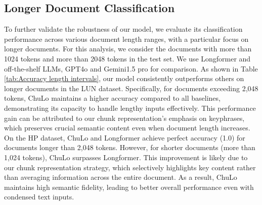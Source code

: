 \documentclass[11pt]{article}
\begin{document}
\subsection{Longer Document Classification}
To further validate the robustness of our model, we evaluate its classification performance across various document length ranges, with a particular focus on longer documents. For this analysis, we consider the documents with more than 1024 tokens and more than 2048 tokens in the test set. 
We use Longformer 
and off-the-shelf LLMs, GPT4o and Gemini1.5 pro for comparison. 
As shown in Table \ref{tab:Accuracy length intervals}, our model consistently outperforms others on longer documents in the LUN dataset. Specifically, for documents exceeding 2,048 tokens, ChuLo maintains a higher accuracy compared to all baselines, demonstrating its capacity to handle lengthy inputs effectively. This performance gain can be attributed to our chunk representation’s emphasis on keyphrases, which preserves crucial semantic content even when document length increases.
On the HP dataset, ChuLo and Longformer achieve perfect accuracy (1.0) for documents longer than 2,048 tokens. However, for shorter documents (more than 1,024 tokens), ChuLo surpasses Longformer. This improvement is likely due to our chunk representation strategy, which selectively highlights key content rather than averaging information across the entire document. As a result, ChuLo maintains high semantic fidelity, leading to better overall performance even with condensed text inputs.
\end{document}
